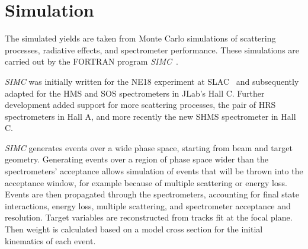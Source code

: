 \section{Simulation}
The simulated yields are taken from Monte Carlo simulations of scattering
processes, radiative effects, and spectrometer performance.
These simulations are carried out by the FORTRAN program
\textit{SIMC}~\cite{simc_github, simc_wiki}.


\textit{SIMC} was initially written for the NE18 experiment at
SLAC~\cite{Makins_1994} and subsequently adapted for the HMS and SOS
spectrometers in JLab's Hall C.
Further development added support for more scattering processes, the pair of
HRS spectrometers in Hall A, and more recently the new SHMS spectrometer in
Hall C.


\textit{SIMC} generates events over a wide phase space, starting from beam and
target geometry.
Generating events over a region of phase space wider than the spectrometers'
acceptance allows simulation of events that will be thrown into the acceptance
window, for example because of multiple scattering or energy loss.
Events are then propagated through the spectrometers, accounting for final
state interactions, energy loss, multiple scattering, and spectrometer
acceptance and resolution.
Target variables are reconstructed from tracks fit at the focal plane.
Then weight is calculated based on a model cross section for the initial
kinematics of each event.





